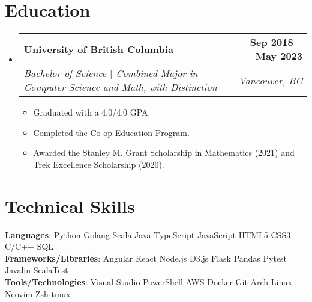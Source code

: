 \documentclass[letterpaper,11pt]{article}
\makeatletter
\newcommand{\resumeItem}[1]{
  \item\small{
    {#1 \vspace{-2pt}}
  }
}
\newcommand{\resumeSubheading}[4]{
  \vspace{-2pt}\item
    \begin{tabular*}{1.0\textwidth}[t]{l@{\extracolsep{\fill}}r}
      \textbf{#1} & \textbf{\small #2} \\
      \textit{\small#3} & \textit{\small #4} \\
    \end{tabular*}\vspace{-7pt}
}
\newcommand{\resumeSubHeadingListStart}{\begin{itemize}[leftmargin=0.0in, label={}]}
\newcommand{\resumeSubHeadingListEnd}{\end{itemize}}
\newcommand{\resumeItemListStart}{\begin{itemize}}
\newcommand{\resumeItemListEnd}{\end{itemize}\vspace{-5pt}}
\makeatother
\begin{document}
\section{Education}
  \resumeSubHeadingListStart
    \resumeSubheading
      {University of British Columbia}{Sep 2018 -- May 2023}
      {Bachelor of Science $|$ Combined Major in Computer Science and Math, with Distinction}{Vancouver, BC}
      \resumeItemListStart
        \resumeItem{Graduated with a 4.0/4.0 GPA.}
        \resumeItem{Completed the Co-op Education Program.}
        \resumeItem{Awarded the Stanley M. Grant Scholarship in Mathematics (2021) and Trek Excellence Scholarship (2020).}
      \resumeItemListEnd
  \resumeSubHeadingListEnd
 \vspace{-16pt}

\section{Technical Skills}
 \begin{itemize}[leftmargin=0.15in, label={}]
    \small{\item{
     \textbf{Languages}{: Python \textperiodcentered{} Golang \textperiodcentered{} Scala \textperiodcentered{} Java \textperiodcentered{} TypeScript \textperiodcentered{} JavaScript \textperiodcentered{} HTML5 \textperiodcentered{} CSS3 \textperiodcentered{} C/C++ \textperiodcentered{} SQL} \\
     \textbf{Frameworks/Libraries}{: Angular \textperiodcentered{} React \textperiodcentered{} Node.js \textperiodcentered{} D3.js \textperiodcentered{} Flask \textperiodcentered{} Pandas \textperiodcentered{} Pytest \textperiodcentered{} Javalin \textperiodcentered{} ScalaTest} \\
     \textbf{Tools/Technologies}{: Visual Studio \textperiodcentered{} PowerShell \textperiodcentered{} AWS \textperiodcentered{} Docker \textperiodcentered{} Git \textperiodcentered{} Arch Linux \textperiodcentered{} Neovim \textperiodcentered{} Zsh \textperiodcentered{} tmux} \\
    }}
 \end{itemize}
\end{document}
